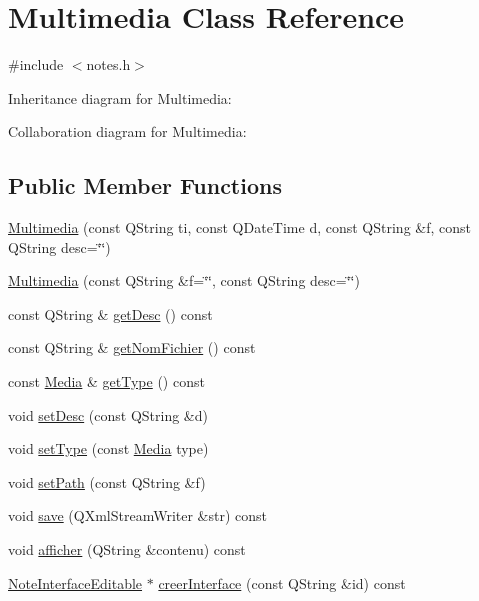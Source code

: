 \hypertarget{classMultimedia}{}\section{Multimedia Class Reference}
\label{classMultimedia}


{\ttfamily \#include $<$notes.\+h$>$}



Inheritance diagram for Multimedia\+:


Collaboration diagram for Multimedia\+:
\subsection*{Public Member Functions}
\begin{DoxyCompactItemize}
\item 
\hyperlink{classMultimedia_aaa8de11ec409b36f4f80322d2a754837}{Multimedia} (const Q\+String ti, const Q\+Date\+Time d, const Q\+String \&f, const Q\+String desc=\char`\"{}\char`\"{})
\item 
\hyperlink{classMultimedia_a19457d6f253c5d2dc8cbc02a7cf155f3}{Multimedia} (const Q\+String \&f=\char`\"{}\char`\"{}, const Q\+String desc=\char`\"{}\char`\"{})
\item 
const Q\+String \& \hyperlink{classMultimedia_a55b61c0abade3536b67ecbf8e8819a66}{get\+Desc} () const 
\item 
const Q\+String \& \hyperlink{classMultimedia_a384dfa906314803b90cb85c61859a9e8}{get\+Nom\+Fichier} () const 
\item 
const \hyperlink{notes_8h_a52d0fa657cd782262400cea98b316ffd}{Media} \& \hyperlink{classMultimedia_ae4a9cdad83cb42246ed667c275f2ade5}{get\+Type} () const 
\item 
void \hyperlink{classMultimedia_a1732a143db560f538e248808d2ce9d5c}{set\+Desc} (const Q\+String \&d)
\item 
void \hyperlink{classMultimedia_af14fa1459dc8586b5cfcf3ada1b190b6}{set\+Type} (const \hyperlink{notes_8h_a52d0fa657cd782262400cea98b316ffd}{Media} type)
\item 
void \hyperlink{classMultimedia_a24661820d6e37a766b9192b8d4469264}{set\+Path} (const Q\+String \&f)
\item 
void \hyperlink{classMultimedia_ad36608ead685b515470630f7d7b25e9b}{save} (Q\+Xml\+Stream\+Writer \&str) const 
\item 
void \hyperlink{classMultimedia_ae85d1c2d18293b3e3924ec45f15ad442}{afficher} (Q\+String \&contenu) const 
\item 
\hyperlink{classNoteInterfaceEditable}{Note\+Interface\+Editable} $\ast$ \hyperlink{classMultimedia_aa308d4052a66a7e6732f67e2490d8c1c}{creer\+Interface} (const Q\+String \&id) const 
\end{DoxyCompactItemize}
